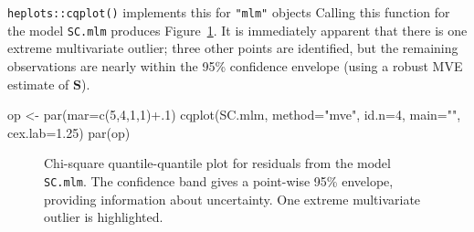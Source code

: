 \documentclass[
  letterpaper,
  10pt,
  krantz2]{krantz}
\makeatletter
\newenvironment{Shaded}{\begin{snugshade}}{\end{snugshade}}
\newcommand{\AttributeTok}[1]{\textcolor[rgb]{0.40,0.45,0.13}{#1}}
\newcommand{\DecValTok}[1]{\textcolor[rgb]{0.68,0.00,0.00}{#1}}
\newcommand{\FloatTok}[1]{\textcolor[rgb]{0.68,0.00,0.00}{#1}}
\newcommand{\FunctionTok}[1]{\textcolor[rgb]{0.28,0.35,0.67}{#1}}
\newcommand{\NormalTok}[1]{\textcolor[rgb]{0.00,0.23,0.31}{#1}}
\newcommand{\OtherTok}[1]{\textcolor[rgb]{0.00,0.23,0.31}{#1}}
\newcommand{\SpecialCharTok}[1]{\textcolor[rgb]{0.37,0.37,0.37}{#1}}
\newcommand{\StringTok}[1]{\textcolor[rgb]{0.13,0.47,0.30}{#1}}
\newenvironment{kframe}{%
  \medskip{}
  \setlength{\fboxsep}{.8em}
  \def\at@end@of@kframe{}%
  \ifinner\ifhmode%
  \def\at@end@of@kframe{\end{minipage}}%
  \begin{minipage}{\columnwidth}%
  \fi\fi%
  \def\FrameCommand##1{\hskip\@totalleftmargin \hskip-\fboxsep
  \colorbox{shadecolor}{##1}\hskip-\fboxsep
      \hskip-\linewidth \hskip-\@totalleftmargin \hskip\columnwidth}%
  \MakeFramed {\advance\hsize-\width
    \@totalleftmargin\z@ \linewidth\hsize
    \@setminipage}}%
{\par\unskip\endMakeFramed%
  \at@end@of@kframe}
\renewenvironment{Shaded}{\begin{kframe}}{\end{kframe}}
\makeatother
\begin{document}
\texttt{heplots::cqplot()} implements this for \texttt{"mlm"} objects
Calling this function for the model \texttt{SC.mlm} produces
Figure~\ref{fig-SC-cqplot}. It is immediately apparent that there is one
extreme multivariate outlier; three other points are identified, but the
remaining observations are nearly within the 95\% confidence envelope
(using a robust MVE estimate of \(\mathbf{S}\)).

\begin{Shaded}
\begin{Highlighting}[]
\NormalTok{op }\OtherTok{\textless{}{-}} \FunctionTok{par}\NormalTok{(}\AttributeTok{mar=}\FunctionTok{c}\NormalTok{(}\DecValTok{5}\NormalTok{,}\DecValTok{4}\NormalTok{,}\DecValTok{1}\NormalTok{,}\DecValTok{1}\NormalTok{)}\SpecialCharTok{+}\NormalTok{.}\DecValTok{1}\NormalTok{)}
\FunctionTok{cqplot}\NormalTok{(SC.mlm, }\AttributeTok{method=}\StringTok{"mve"}\NormalTok{, }
       \AttributeTok{id.n=}\DecValTok{4}\NormalTok{, }
       \AttributeTok{main=}\StringTok{""}\NormalTok{, }
       \AttributeTok{cex.lab=}\FloatTok{1.25}\NormalTok{)}
\FunctionTok{par}\NormalTok{(op)}
\end{Highlighting}
\end{Shaded}

\begin{figure}[H]


\caption{\label{fig-SC-cqplot}Chi-square quantile-quantile plot for
residuals from the model \texttt{SC.mlm}. The confidence band gives a
point-wise 95\% envelope, providing information about uncertainty. One
extreme multivariate outlier is highlighted.}

\end{figure}%
\end{document}
